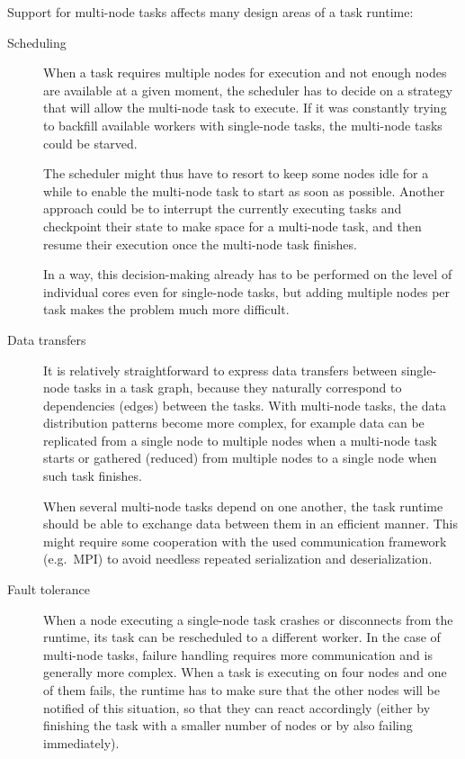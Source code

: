 Support for multi-node tasks affects many design areas of a task runtime:
\begin{description}
	\item[Scheduling] When a task requires multiple nodes for execution and not enough nodes are available at a given
		moment, the scheduler has to decide on a strategy that will allow the multi-node task to execute.
		If it was constantly trying to backfill available workers with single-node tasks, the multi-node
		tasks could be starved.

		The scheduler might thus have to resort to keep some nodes idle for a while to enable the
		multi-node task to start as soon as possible. Another approach could be to interrupt the currently
		executing tasks and checkpoint their state to make space for a multi-node task, and then resume
		their execution once the multi-node task finishes.

		In a way, this decision-making already has to be performed on the level of individual cores even
		for single-node tasks, but adding multiple nodes per task makes the problem much more difficult.
	\item[Data transfers] It is relatively straightforward to express data transfers between single-node tasks in a task
		graph, because they naturally correspond to dependencies (edges) between the tasks. With multi-node
		tasks, the data distribution patterns become more complex, for example data can be replicated from
		a single node to multiple nodes when a multi-node task starts or gathered (reduced) from multiple
		nodes to a single node when such task finishes.

		When several multi-node tasks depend on one another, the task runtime should be able to exchange
		data between them in an efficient manner. This might require some cooperation with the used
		communication framework (e.g.\ MPI) to avoid needless repeated serialization and deserialization.
	\item[Fault tolerance] When a node executing a single-node task crashes or disconnects from the runtime, its task can be
		rescheduled to a different worker. In the case of multi-node tasks, failure handling requires more
		communication and is generally more complex. When a task is executing on four nodes and one of them
		fails, the runtime has to make sure that the other nodes will be notified of this situation, so
		that they can react accordingly (either by finishing the task with a smaller number of nodes or by
		also failing immediately).
\end{description}

